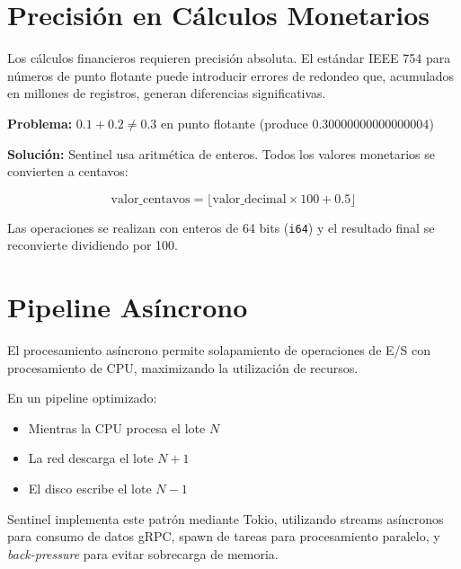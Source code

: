 \section{Precisión en Cálculos Monetarios}

Los cálculos financieros requieren precisión absoluta. El estándar IEEE 754 para números de punto flotante puede introducir errores de redondeo que, acumulados en millones de registros, generan diferencias significativas.

\textbf{Problema:} $0.1 + 0.2 \neq 0.3$ en punto flotante (produce $0.30000000000000004$)

\textbf{Solución:} Sentinel usa aritmética de enteros. Todos los valores monetarios se convierten a centavos:

\[
\text{valor\_centavos} = \lfloor \text{valor\_decimal} \times 100 + 0.5 \rfloor
\]

Las operaciones se realizan con enteros de 64 bits (\texttt{i64}) y el resultado final se reconvierte dividiendo por 100.

\section{Pipeline Asíncrono}

El procesamiento asíncrono permite solapamiento de operaciones de E/S con procesamiento de CPU, maximizando la utilización de recursos.

En un pipeline optimizado:
\begin{itemize}
    \item Mientras la CPU procesa el lote $N$
    \item La red descarga el lote $N+1$
    \item El disco escribe el lote $N-1$
\end{itemize}

Sentinel implementa este patrón mediante Tokio, utilizando streams asíncronos para consumo de datos gRPC, spawn de tareas para procesamiento paralelo, y \textit{back-pressure} para evitar sobrecarga de memoria.

\vfill
\newpage
